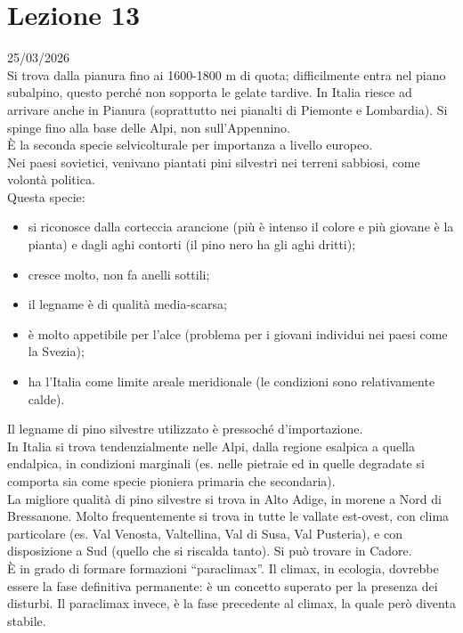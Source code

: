 \section{Lezione 13} \hfill 25/03/2026\\
Si trova dalla pianura fino ai 1600-1800 m di quota; difficilmente entra nel piano subalpino, questo perché non sopporta le gelate tardive. In Italia riesce ad arrivare anche in Pianura (soprattutto nei pianalti di Piemonte e Lombardia). Si spinge fino alla base delle Alpi, non sull'Appennino.\\
È la seconda specie selvicolturale per importanza a livello europeo.\\
Nei paesi sovietici, venivano piantati pini silvestri nei terreni sabbiosi, come volontà politica.\\
Questa specie:
\begin{itemize}[nosep]
    \item si riconosce dalla corteccia arancione (più è intenso il colore e più giovane è la pianta) e dagli aghi contorti (il pino nero ha gli aghi dritti);
    \item cresce molto, non fa anelli sottili;
    \item il legname è di qualità media-scarsa;
    \item è molto appetibile per l'alce (problema per i giovani individui nei paesi come la Svezia);
    \item ha l'Italia come limite areale meridionale (le condizioni sono relativamente calde).
\end{itemize}
Il legname di pino silvestre utilizzato è pressoché d'importazione.\\
In Italia si trova tendenzialmente nelle Alpi, dalla regione esalpica a quella endalpica, in condizioni marginali (es. nelle pietraie ed in quelle degradate si comporta sia come specie pioniera primaria che secondaria).\\
La migliore qualità di pino silvestre si trova in Alto Adige, in morene a Nord di Bressanone. Molto frequentemente si trova in tutte le vallate est-ovest, con clima particolare (es. Val Venosta, Valtellina, Val di Susa, Val Pusteria), e con disposizione a Sud (quello che si riscalda tanto). Si può trovare in Cadore.\\
È in grado di formare formazioni ``paraclimax''. Il climax, in ecologia, dovrebbe essere la fase definitiva permanente: è un concetto superato per la presenza dei disturbi. Il paraclimax invece, è la fase precedente al climax, la quale però diventa stabile.\\
